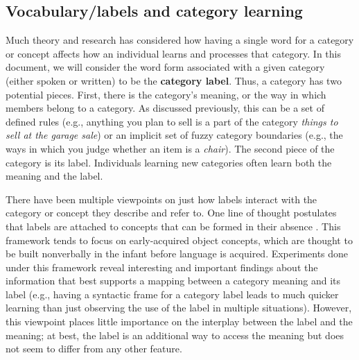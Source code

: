 \documentclass[../dissertation.tex]{subfiles}
\begin{document}
\subsection{Vocabulary/labels and category learning}
	Much theory and research has considered how having a single word for a category or concept affects how an individual learns and processes that category. In this document, we will consider the word form associated with a given category (either spoken or written) to be the \textbf{category label}. Thus, a category has two potential pieces. First, there is the category's meaning, or the way in which members belong to a category. As discussed previously, this can be a set of defined rules (e.g., anything you plan to sell is a part of the category \textit{things to sell at the garage sale}) or an implicit set of fuzzy category boundaries (e.g., the ways in which you judge whether an item is a \textit{chair}). The second piece of the category is its label. Individuals learning new categories often learn both the meaning and the label. \par
	There have been multiple viewpoints on just how labels interact with the category or concept they describe and refer to. One line of thought postulates that labels are attached to concepts that can be formed in their absence \citep{Gillette1999,Snedeker2004}. This framework tends to focus on early-acquired object concepts, which are thought to be built nonverbally in the infant before language is acquired. Experiments done under this framework reveal interesting and important findings about the information that best supports a mapping between a category meaning and its label (e.g., having a syntactic frame for a category label leads to much quicker learning than just observing the use of the label in multiple situations).  However, this viewpoint places little importance on the interplay between the label and the meaning; at best, the label is an additional way to access the meaning but does not seem to differ from any other feature. \par
\end{document}
